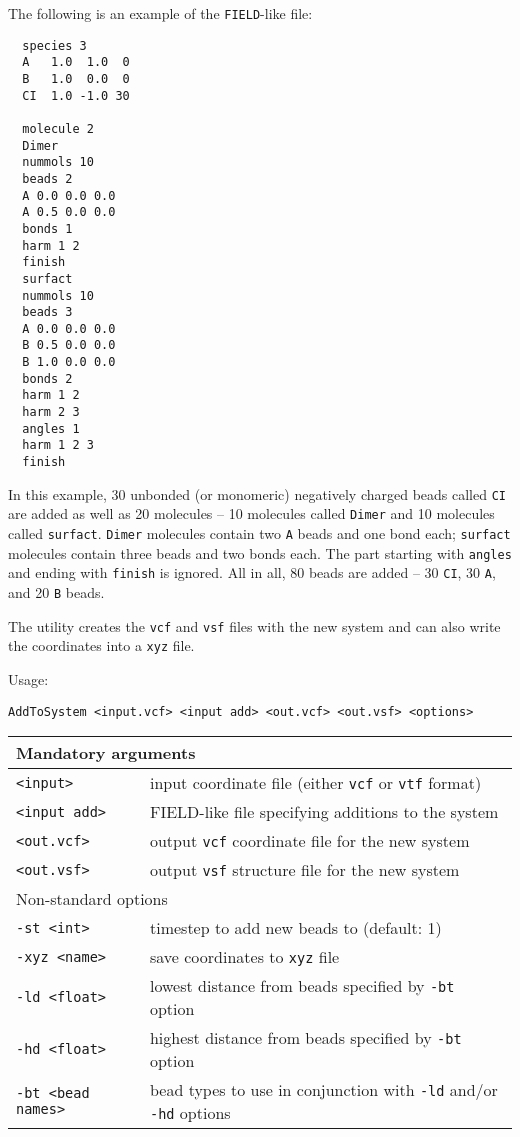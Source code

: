 The following is an example of the \texttt{FIELD}-like file:
\begin{verbatim}
  species 3
  A   1.0  1.0  0
  B   1.0  0.0  0
  CI  1.0 -1.0 30

  molecule 2
  Dimer
  nummols 10
  beads 2
  A 0.0 0.0 0.0
  A 0.5 0.0 0.0
  bonds 1
  harm 1 2
  finish
  surfact
  nummols 10
  beads 3
  A 0.0 0.0 0.0
  B 0.5 0.0 0.0
  B 1.0 0.0 0.0
  bonds 2
  harm 1 2
  harm 2 3
  angles 1
  harm 1 2 3
  finish
\end{verbatim}
In this example, 30 unbonded (or monomeric) negatively charged beads called
\texttt{CI} are added as well as 20 molecules -- 10 molecules called
\texttt{Dimer} and 10 molecules called \texttt{surfact}. \texttt{Dimer}
molecules contain two \texttt{A} beads and one bond each; \texttt{surfact}
molecules contain three beads and two bonds each. The part starting with
\texttt{angles} and ending with \texttt{finish} is ignored. All in all, 80
beads are added -- 30 \texttt{CI}, 30 \texttt{A}, and 20 \texttt{B} beads.

The utility creates the \texttt{vcf} and \texttt{vsf} files with the new
system and can also write the coordinates into a \texttt{xyz} file.

Usage:

\vspace{1em}
\noindent
\texttt{AddToSystem <input.vcf> <input add> <out.vcf> <out.vsf> <options>}

\vspace{1em}
\noindent
\begin{longtable}{p{}p{}}
  \toprule
  \multicolumn{2}{l}{Mandatory arguments} \\
  \midrule
  \texttt{<input>} & input coordinate file (either \texttt{vcf} or
    \texttt{vtf} format) \\
  \texttt{<input add>} & FIELD-like file specifying additions to the system \\
  \texttt{<out.vcf>} & output \texttt{vcf} coordinate file for the new
  system \\
  \texttt{<out.vsf>} & output \texttt{vsf} structure file for the new system \\
  \toprule
  \multicolumn{2}{l}{Non-standard options} \\
  \midrule
  \texttt{-st <int>} & timestep to add new beads to (default: 1) \\
  \texttt{-xyz <name>} & save coordinates to \texttt{xyz} file \\
  \texttt{-ld <float>} & lowest distance from beads specified by
    \texttt{-bt} option \\
  \texttt{-hd <float>} & highest distance from beads specified by
    \texttt{-bt} option \\
  \texttt{-bt <bead names>} & bead types to use in conjunction with
    \texttt{-ld} and/or \texttt{-hd} options \\
  \bottomrule
\end{longtable}
